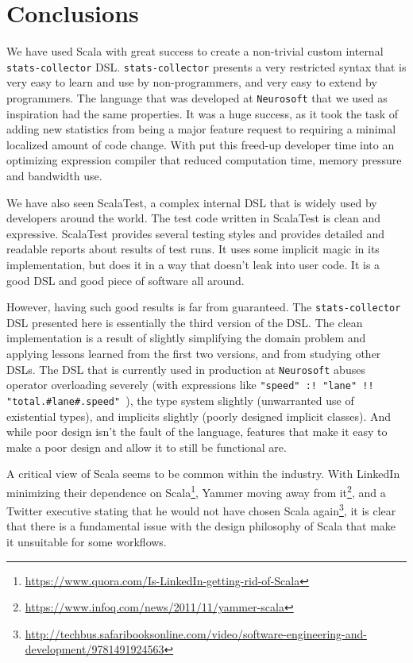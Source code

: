 \chapter{Conclusions}

We have used Scala with great success to create a non-trivial custom internal \texttt{stats-collector} DSL. \texttt{stats-collector} presents a very restricted syntax that is very easy to learn and use by non-programmers, and very easy to extend by programmers. The language that was developed at \texttt{Neurosoft} that we used as inspiration had the same properties. It was a huge success, as it took the task of adding new statistics from being a major feature request to requiring a minimal localized amount of code change. With put this freed-up developer time into an optimizing expression compiler that reduced computation time, memory pressure and bandwidth use.

We have also seen ScalaTest, a complex internal DSL that is widely used by developers around the world. The test code written in ScalaTest is clean and expressive. ScalaTest provides several testing styles and provides detailed and readable reports about results of test runs. It uses some implicit magic in its implementation, but does it in a way that doesn't leak into user code. It is a good DSL and good piece of software all around.

However, having such good results is far from guaranteed. The \texttt{stats-collector} DSL presented here is essentially the third version of the DSL. The clean implementation is a result of slightly simplifying the domain problem and applying lessons learned from the first two versions, and from studying other DSLs. The DSL that is currently used in production at \texttt{Neurosoft} abuses operator overloading severely (with expressions like \texttt{"speed" :! "lane" !! "total.#lane#.speed" }), the type system slightly (unwarranted use of existential types), and implicits slightly (poorly designed implicit classes). And while poor design isn't the fault of the language, features that make it easy to make a poor design and allow it to still be functional are.

A critical view of Scala seems to be common within the industry. With LinkedIn minimizing their dependence on Scala\footnote{\url{https://www.quora.com/Is-LinkedIn-getting-rid-of-Scala}}, Yammer moving away from it\footnote{\url{https://www.infoq.com/news/2011/11/yammer-scala}}, and a Twitter executive stating that he would not have chosen Scala again\footnote{\url{http://techbus.safaribooksonline.com/video/software-engineering-and-development/9781491924563}}, it is clear that there is a fundamental issue with the design philosophy of Scala that make it unsuitable for some workflows.

